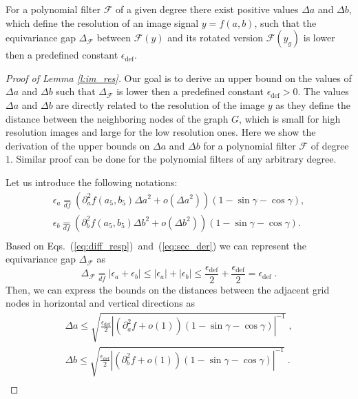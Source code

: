 \documentclass[10pt,journal,compsoc]{IEEEtran}
\newcommand{\df}{\mathop{=}\limits_{df}}
\begin{document}
	\begin{lemma}
		For a polynomial filter $\mathcal{F}$ of a given degree there exist positive values $\Delta a$ and $\Delta b$, which define the resolution of an image signal $y=f(a,b)$, such that the equivariance gap $\Delta_\mathcal{F}$ between $\mathcal{F}(y)$ and its rotated version $\mathcal{F}(y_g)$ is lower then a predefined constant $\epsilon_\text{def}$.
		\label{l:im_res}
	\end{lemma}
	\begin{proof}[Proof of Lemma \ref{l:im_res}]
		Our goal is to derive an upper bound on the values of $\Delta a$ and $\Delta b$ such that $\Delta_\mathcal{F}$ is lower then a predefined constant $\epsilon_\text{def} > 0$. The values $\Delta a$ and $\Delta b$ are directly related to the resolution of the image $y$ as they define the distance between the neighboring nodes of the graph $G$, which is small for high resolution images and large for the low resolution ones. Here we show the derivation of the upper bounds on $\Delta a$ and $\Delta b$ for a polynomial filter $\mathcal{F}$ of degree $1$. Similar proof can be done for the polynomial filters of any arbitrary degree.

		Let us introduce the following notations:
		\begin{equation}
		\begin{aligned}
		\epsilon_a \df \left(\partial^2_a f (a_5,b_5) \Delta a^2 + o(\Delta a^2)\right)(1-\sin\gamma -\cos\gamma), \\
		\epsilon_b \df \left(\partial^2_b f (a_5,b_5) \Delta b^2 + o(\Delta b^2)\right)(1-\sin\gamma -\cos\gamma). \\
		\end{aligned}
		\end{equation}
		\noindent
		Based on Eqs.~(\ref{eq:diff_resp})~and~(\ref{eq:sec_der}) we can represent the equivariance gap $\Delta_\mathcal{F}$ as
		\begin{equation}
		\Delta_\mathcal{F} \df |\epsilon_a + \epsilon_b| \leq |\epsilon_a| + |\epsilon_b| \leq  \frac{\epsilon_\text{def}}{2} + \frac{\epsilon_\text{def}}{2} = \epsilon_\text{def} \;.
		\label{eq:cond_diff}
		\end{equation}
		\noindent
		Then, we can express the bounds on the distances between the adjacent grid nodes in horizontal and vertical directions as
		\begin{equation}
		\begin{aligned}
		\Delta a \leq \sqrt{\frac{\epsilon_\text{def}}{2} \left|\left(\partial^2_a f + o(1)\right)(1-\sin\gamma -\cos\gamma)\right|^{-1}}\;, \\
		\Delta b \leq \sqrt{\frac{\epsilon_\text{def}}{2} \left|\left(\partial^2_b f + o(1)\right)(1-\sin\gamma -\cos\gamma)\right|^{-1}}\;. \\
		\end{aligned}
		\label{eq:response_pattern_r}
		\end{equation}


\end{proof}
\end{document}
